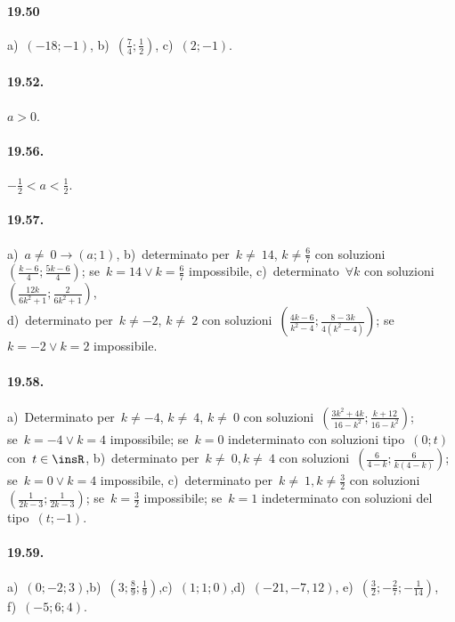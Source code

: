 \paragraph{19.50} a)~$(-18;-1)$, \quad b)~$\left(\frac{7}{4};\frac{1}{2}\right)$, \quad c)~$(2;-1)$.

\paragraph{19.52.} $a>0$.

\paragraph{19.56.} $-\frac{1}{2}<a<\frac{1}{2}$.

\paragraph{19.57.} a)~$a\neq~0\rightarrow (a;1)$,
\quad b)~determinato per~$k\neq~14$, $k\neq \frac{6}{7}$ con soluzioni~$\left(\frac{k-6}{4}; \frac{5k-6}{4}\right)$;
se~$k=14\vee k=\frac{6}{7}$ impossibile,
\quad c)~determinato~$\forall k$ con soluzioni~$\left(\frac{12k}{6k^{2}+1};\frac{2}{6k^{2}+1}\right)$,
\protect\\ d)~determinato per~$k\neq -2$, $k\neq~2$ con soluzioni~$\left(\frac{4k-6}{k^{2}-4}; \frac{8-3k}{4(k^{2}-4)}\right)$; se~$k=-2 \vee k=2$ impossibile.

\paragraph{19.58.} a)~Determinato per~$k\neq -4$, $k\neq~4$, $k\neq~0$ con soluzioni~$\left(\frac{3k^{2}+4k}{16-k^{2}}; \frac{k+12}{16-k^{2}}\right)$;\protect\\
se~$k=-4\vee k=4$ impossibile; se~$k=0$ indeterminato con soluzioni tipo~$(0;t)$ con~$t\in\insR$,
\quad b)~determinato per~$k\neq~0, k\neq~4$ con soluzioni~$\left(\frac{6}{4-k}; \frac{6}{k(4-k)}\right)$;
se~$k=0\vee k=4$ impossibile,
\quad c)~determinato per~$k\neq~1, k\neq \frac{3}{2}$ con soluzioni~$\left(\frac{1}{2k-3}; \frac{1}{2k-3}\right)$;
se~$k=\frac{3}{2}$ impossibile; se~$k=1$ indeterminato con soluzioni del tipo~$(t;-1)$.

\paragraph{19.59.} a)~$(0; -2; 3)$,\quad b)~$\left(3;\frac{8}{9};\frac{1}{9}\right)$,\quad c)~$(1; 1;0)$,\quad d)~$(-21, -7, 12)$, \quad e)~$\left(\frac{3}{2};-\frac{2}{7};-\frac{1}{14}\right)$,\protect\\ f)~$(-5; 6; 4)$.


